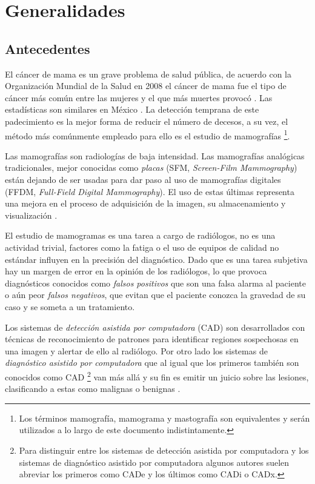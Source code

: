 \chapter{Generalidades}
\label{generalidades}

 \setcounter{page}{1}

\section{Antecedentes}

El cáncer de mama es un grave problema de salud pública, de acuerdo con la
Organización Mundial de la Salud en 2008 el cáncer de mama fue el tipo de
cáncer más común entre las mujeres y el que más muertes provocó
\cite{cancerreport}. Las estadísticas son similares en México \cite{mxcancer,
inegi}. La detección temprana de este padecimiento es la mejor forma de reducir
el número de decesos, a su vez, el método más comúnmente empleado para ello es
el estudio de mamografías \footnote{Los términos mamografía, mamograma y
mastografía son equivalentes y serán utilizados a lo largo de este documento
indistintamente.}. 

Las mamografías son radiologías de baja intensidad. Las mamografías analógicas
tradicionales, mejor conocidas como \textit{placas} (SFM, \textit{Screen-Film
Mammography}) están dejando de ser usadas para dar paso al uso de mamografías
digitales (FFDM, \textit{Full-Field Digital Mammography}). El uso de estas
últimas representa una mejora en el proceso de adquisición de la imagen, su
almacenamiento y visualización \cite{pisano2000current}.

El estudio de mamogramas es una tarea a cargo de radiólogos, no es una
actividad trivial, factores como la fatiga o el uso de equipos de calidad no
estándar influyen en la precisión del diagnóstico. Dado que es una tarea
subjetiva hay un margen de error en la opinión de los radiólogos, lo que
provoca diagnósticos conocidos como \textit{falsos positivos} que son una falsa
alarma al paciente o aún peor \textit{falsos negativos}, que evitan que el
paciente conozca la gravedad de su caso y se someta a un tratamiento.

Los sistemas de \textit{detección asistida por computadora} (CAD) son
desarrollados con técnicas de reconocimiento de patrones para identificar
regiones sospechosas en una imagen y alertar de ello al radiólogo. Por otro
lado los sistemas de \textit{diagnóstico asistido por computadora} que al igual
que los primeros también son conocidos como CAD \footnote{Para distinguir entre
los sistemas de detección asistida por computadora y los sistemas de
diagnóstico asistido por computadora algunos autores suelen abreviar los
primeros como CADe y los últimos como CADi o CADx.} van más allá y su fin es
emitir un juicio sobre las lesiones, clasificando a estas como malignas o
benignas \cite{castellino2005computer}. 

